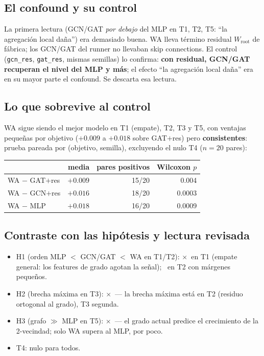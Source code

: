 \documentclass[11pt]{article}
\newcommand{\ok}{\textcolor{green!50!black}{\checkmark}}
\newcommand{\falla}{\textcolor{red!70!black}{$\times$}}
\begin{document}
\subsection{El confound y su control}

La primera lectura (GCN/GAT \emph{por debajo} del MLP en T1, T2, T5:
``la agregaci\'on local da\~na'') era demasiado buena. WA lleva t\'ermino
residual $W_{\text{root}}$ de f\'abrica; los GCN/GAT del runner no llevaban
skip connections. El control (\texttt{gcn\_res}, \texttt{gat\_res}, mismas
semillas) lo confirma: \textbf{con residual, GCN/GAT recuperan el nivel del
MLP y m\'as}; el efecto ``la agregaci\'on local da\~na'' era en su mayor
parte el confound. Se descarta esa lectura.

\subsection{Lo que sobrevive al control}

WA sigue siendo el mejor modelo en T1 (empate), T2, T3 y T5, con
ventajas peque\~nas por objetivo ($+0.009$ a $+0.018$ sobre GAT$+$res)
pero \textbf{consistentes}: prueba pareada por (objetivo, semilla),
excluyendo el nulo T4 ($n=20$ pares):
\begin{center}
\begin{tabular}{lrrr}
\toprule
 & \textbf{media} & \textbf{pares positivos} & \textbf{Wilcoxon $p$}\\
\midrule
WA $-$ GAT$+$res & $+0.009$ & 15/20 & 0.004\\
WA $-$ GCN$+$res & $+0.016$ & 18/20 & 0.0003\\
WA $-$ MLP       & $+0.018$ & 16/20 & 0.0009\\
\bottomrule
\end{tabular}
\end{center}

\subsection{Contraste con las hip\'otesis y lectura revisada}

\begin{itemize}
  \item H1 (orden MLP $<$ GCN/GAT $<$ WA en T1/T2): \falla\ en T1 (empate
  general: los features de grado agotan la se\~nal); \ok\ en T2 con
  m\'argenes peque\~nos.
  \item H2 (brecha m\'axima en T3): \falla\ --- la brecha m\'axima est\'a
  en T2 (residuo ortogonal al grado), T3 segunda.
  \item H3 (grafo $\gg$ MLP en T5): \falla\ --- el grado actual predice el
  crecimiento de la 2-vecindad; solo WA supera al MLP, por poco.
  \item T4: nulo para todos.
\end{itemize}
\end{document}
